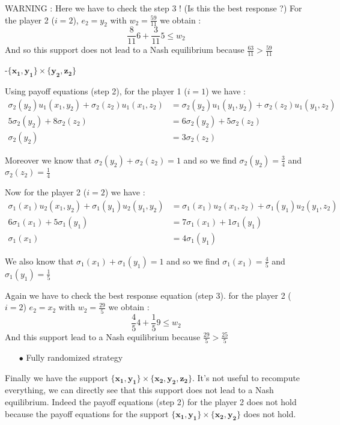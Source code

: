 WARNING : Here we have to check the step 3 ! (Is this the best response ?) For the player 2 ($i=2$), $e_2=y_2$ with $w_2=\frac{59}{11}$ we obtain :
\begin{equation*}
    \frac{8}{11}6 + \frac{3}{11}5 \le w_2
\end{equation*}
And so this support does not lead to a Nash equilibrium because $\frac{63}{11}>\frac{59}{11}$

-$\mathbf{\{x_1,y_1\}}\times\mathbf{\{y_2,z_2\}}$

Using payoff equations (step 2), for the player 1 ($i=1$) we have : 
\begin{align*}
 \sigma_2(y_2)u_1(x_1,y_2) + \sigma_2(z_2)u_1(x_1,z_2) &= \sigma_2(y_2)u_1(y_1,y_2) + \sigma_2(z_2)u_1(y_1,z_2) \\
 5\sigma_2(y_2)+8\sigma_2(z_2)&= 6\sigma_2(y_2) + 5\sigma_2(z_2) \\
 \sigma_2(y_2)&=3\sigma_2(z_2)
\end{align*}

Moreover we know that $\sigma_2(y_2) + \sigma_2(z_2) = 1$ and so we find $\sigma_2(y_2)=\frac{3}{4}$ and $\sigma_2(z_2)=\frac{1}{4}$

Now for the player 2 ($i=2$) we have : 
\begin{align*}
 \sigma_1(x_1)u_2(x_1,y_2) + \sigma_1(y_1)u_2(y_1,y_2) &= \sigma_1(x_1)u_2(x_1,z_2) + \sigma_1(y_1)u_2(y_1,z_2) \\
 6\sigma_1(x_1)+5\sigma_1(y_1)&= 7\sigma_1(x_1) + 1\sigma_1(y_1) \\
 \sigma_1(x_1)&=4\sigma_1(y_1)
\end{align*}

We also know that $\sigma_1(x_1) + \sigma_1(y_1) = 1$ and so we find $\sigma_1(x_1)=\frac{4}{5}$ and $\sigma_1(y_1)=\frac{1}{5}$

Again we have to check the best response equation (step 3). for the player 2 ($i=2$) $e_2=x_2$ with $w_2=\frac{29}{5}$ we obtain :
\begin{equation*}
    \frac{4}{5}4 + \frac{1}{5}9 \le w_2
\end{equation*}
And this support lead to a Nash equilibrium because $\frac{29}{5}>\frac{25}{5}$



\begin{itemize}
  \item[$\bullet$] Fully randomized strategy 
\end{itemize}

Finally we have the support $\mathbf{\{x_1,y_1\}}\times\mathbf{\{x_2,y_2,z_2\}}$. It's not useful to recompute everything, we can directly see that this support does not lead to a Nash equilibrium. Indeed the payoff equations (step 2) for the player 2 does not hold because the payoff equations for the support $\mathbf{\{x_1,y_1\}}\times\mathbf{\{x_2,y_2\}}$  does not hold.


